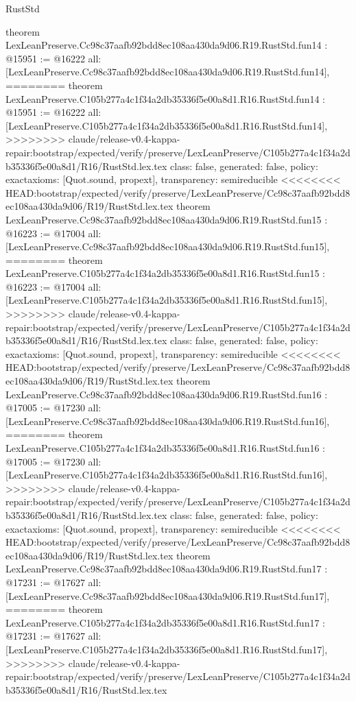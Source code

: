 \begin{lexlean}{RustStd}
\begin{coremodule}
{\begin{coremodule}
{{{{{{{{{{{{{{{{theorem LexLeanPreserve.Cc98c37aafb92bdd8ec108aa430da9d06.R19.RustStd.fun14 : @15951 := @16222 {
  all: [LexLeanPreserve.Cc98c37aafb92bdd8ec108aa430da9d06.R19.RustStd.fun14],
========
theorem LexLeanPreserve.C105b277a4c1f34a2db35336f5e00a8d1.R16.RustStd.fun14 : @15951 := @16222 {
  all: [LexLeanPreserve.C105b277a4c1f34a2db35336f5e00a8d1.R16.RustStd.fun14],
>>>>>>>> claude/release-v0.4-kappa-repair:bootstrap/expected/verify/preserve/LexLeanPreserve/C105b277a4c1f34a2db35336f5e00a8d1/R16/RustStd.lex.tex
  class: false,
  generated: false,
  policy: exact{axioms: [Quot.sound, propext]},
  transparency: semireducible
}
<<<<<<<< HEAD:bootstrap/expected/verify/preserve/LexLeanPreserve/Cc98c37aafb92bdd8ec108aa430da9d06/R19/RustStd.lex.tex
theorem LexLeanPreserve.Cc98c37aafb92bdd8ec108aa430da9d06.R19.RustStd.fun15 : @16223 := @17004 {
  all: [LexLeanPreserve.Cc98c37aafb92bdd8ec108aa430da9d06.R19.RustStd.fun15],
========
theorem LexLeanPreserve.C105b277a4c1f34a2db35336f5e00a8d1.R16.RustStd.fun15 : @16223 := @17004 {
  all: [LexLeanPreserve.C105b277a4c1f34a2db35336f5e00a8d1.R16.RustStd.fun15],
>>>>>>>> claude/release-v0.4-kappa-repair:bootstrap/expected/verify/preserve/LexLeanPreserve/C105b277a4c1f34a2db35336f5e00a8d1/R16/RustStd.lex.tex
  class: false,
  generated: false,
  policy: exact{axioms: [Quot.sound, propext]},
  transparency: semireducible
}
<<<<<<<< HEAD:bootstrap/expected/verify/preserve/LexLeanPreserve/Cc98c37aafb92bdd8ec108aa430da9d06/R19/RustStd.lex.tex
theorem LexLeanPreserve.Cc98c37aafb92bdd8ec108aa430da9d06.R19.RustStd.fun16 : @17005 := @17230 {
  all: [LexLeanPreserve.Cc98c37aafb92bdd8ec108aa430da9d06.R19.RustStd.fun16],
========
theorem LexLeanPreserve.C105b277a4c1f34a2db35336f5e00a8d1.R16.RustStd.fun16 : @17005 := @17230 {
  all: [LexLeanPreserve.C105b277a4c1f34a2db35336f5e00a8d1.R16.RustStd.fun16],
>>>>>>>> claude/release-v0.4-kappa-repair:bootstrap/expected/verify/preserve/LexLeanPreserve/C105b277a4c1f34a2db35336f5e00a8d1/R16/RustStd.lex.tex
  class: false,
  generated: false,
  policy: exact{axioms: [Quot.sound, propext]},
  transparency: semireducible
}
<<<<<<<< HEAD:bootstrap/expected/verify/preserve/LexLeanPreserve/Cc98c37aafb92bdd8ec108aa430da9d06/R19/RustStd.lex.tex
theorem LexLeanPreserve.Cc98c37aafb92bdd8ec108aa430da9d06.R19.RustStd.fun17 : @17231 := @17627 {
  all: [LexLeanPreserve.Cc98c37aafb92bdd8ec108aa430da9d06.R19.RustStd.fun17],
========
theorem LexLeanPreserve.C105b277a4c1f34a2db35336f5e00a8d1.R16.RustStd.fun17 : @17231 := @17627 {
  all: [LexLeanPreserve.C105b277a4c1f34a2db35336f5e00a8d1.R16.RustStd.fun17],
>>>>>>>> claude/release-v0.4-kappa-repair:bootstrap/expected/verify/preserve/LexLeanPreserve/C105b277a4c1f34a2db35336f5e00a8d1/R16/RustStd.lex.tex
}}}}}}}}}}}}}}}}}}}}}
\end{coremodule}}
\end{coremodule}
\end{lexlean}
